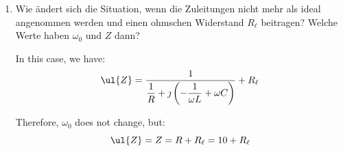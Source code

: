 \begin{ejercicio}
\begin{enumerate}
        Therefore, we have that:
        \begin{equation*}
            \ul{Z} = Z = R = \unit[10]{\Omega}
        \end{equation*}
        

        \item Wie ändert sich die Situation, wenn die Zuleitungen nicht mehr als ideal angenommen werden und einen ohmschen Widerstand $R_\ell$ beitragen? Welche Werte haben $\omega_0$ und $Z$ dann?
        
        In this case, we have:
        \begin{align*}
            \ul{Z} = \dfrac{1}{\dfrac{1}{R} + \jmath \left(-\dfrac{1}{\omega L} + \omega C\right)}  + R_{\ell}
        \end{align*}

        Therefore, $\omega_0$ does not change, but:
        \begin{equation*}
            \ul{Z} = Z = R + R_{\ell} = 10 + R_{\ell}
        \end{equation*}
    \end{enumerate}
\end{ejercicio}

